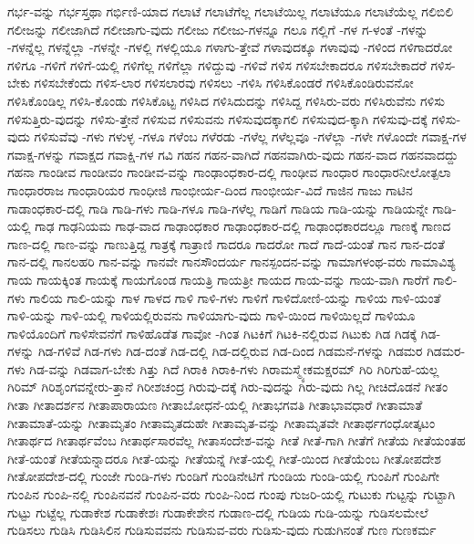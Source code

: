 {ಗರ್ಭ-ವನ್ನು
ಗರ್ಭಸ್ತಥಾ
ಗರ್ಭಿಣಿ-ಯಾದ
ಗಲಾಟೆ
ಗಲಾಟೆಗೆಲ್ಲ
ಗಲಾಟೆಯಿಲ್ಲ
ಗಲಾಟೆಯೂ
ಗಲಾಟೆಯೆಲ್ಲ
ಗಲಿಬಿಲಿ
ಗಲೀಜನ್ನು
ಗಲೀಜಾಗಿದೆ
ಗಲೀಜಾಗು-ವುದು
ಗಲೀಜು
ಗಲೀಜು-ಗಳನ್ನೂ
ಗಲೂ
ಗಲ್ಲಿಗೆ
-ಗಳ
ಗ-ಳಂತೆ
-ಗಳನ್ನು
-ಗಳನ್ನೆಲ್ಲ
ಗಳನ್ನೆಲ್ಲಾ
-ಗಳನ್ನೇ
-ಗಳಲ್ಲಿ
ಗಳಲ್ಲಿಯೂ
ಗಳಾಗು-ತ್ತೇವೆ
ಗಳಾವುದಕ್ಕೂ
ಗಳಾವುವು
-ಗಳಿಂದ
ಗಳಿಗಾದರೋ
ಗಳಿಗೂ
-ಗಳಿಗೆ
ಗಳಿಗೆ-ಯಲ್ಲಿ
ಗಳಿಗೆಲ್ಲ
ಗಳಿಗೆಲ್ಲಾ
ಗಳಿದ್ದುವು
-ಗಳಿವೆ
ಗಳಿಸ
ಗಳಿಸಬೇಕಾದರೂ
ಗಳಿಸಬೇಕಾದರೆ
ಗಳಿಸ-ಬೇಕು
ಗಳಿಸಬೇಕೆಂದು
ಗಳಿಸ-ಲಾರ
ಗಳಿಸಲಾರವು
ಗಳಿಸಲು
-ಗಳಿಸಿ
ಗಳಿಸಿಕೊಂಡರೆ
ಗಳಿಸಿಕೊಂಡಿರುವನೋ
ಗಳಿಸಿಕೊಂಡಿಲ್ಲ
ಗಳಿಸಿ-ಕೊಂಡು
ಗಳಿಸಿಕೊಟ್ಟ
ಗಳಿಸಿದ
ಗಳಿಸಿದುದನ್ನು
ಗಳಿಸಿದ್ದ
ಗಳಿಸಿರು-ವರು
ಗಳಿಸಿರುವೆನು
ಗಳಿಸು
ಗಳಿಸುತ್ತಿರು-ವುದನ್ನು
ಗಳಿಸು-ತ್ತೇನೆ
ಗಳಿಸುವ
ಗಳಿಸುವನು
ಗಳಿಸುವುದಕ್ಕಾಗಲಿ
ಗಳಿಸುವುದ-ಕ್ಕಾಗಿ
ಗಳಿಸುವು-ದಕ್ಕೆ
ಗಳಿಸು-ವುದು
ಗಳಿಸುವೆವು
-ಗಳು
ಗಳುಳ್ಳ
-ಗಳೂ
ಗಳೆಂಬ
ಗಳೆರಡು
-ಗಳೆಲ್ಲ
ಗಳೆಲ್ಲವೂ
-ಗಳೆಲ್ಲಾ
-ಗಳೇ
ಗಳೊಂದೇ
ಗವಾಕ್ಷ-ಗಳ
ಗವಾಕ್ಷ-ಗಳನ್ನು
ಗವಾಕ್ಷದ
ಗವಾಕ್ಷಿ-ಗಳ
ಗವಿ
ಗಹನ
ಗಹನ-ವಾಗಿದೆ
ಗಹನವಾಗಿರು-ವುದು
ಗಹನ-ವಾದ
ಗಹನವಾದದ್ದು
ಗಹನಾ
ಗಾಂಡೀವ
ಗಾಂಡೀವಂ
ಗಾಂಡೀವ-ವನ್ನು
ಗಾಂಢಾಂಧಕಾರ-ದಲ್ಲಿ
ಗಾಂಢೀವ
ಗಾಂಧಾರ
ಗಾಂಧಾರನೀಲೋತ್ಪಲಾ
ಗಾಂಧಾರರಾಜ
ಗಾಂಧಾರಿಯರ
ಗಾಂಧೀಜಿ
ಗಾಂಭೀರ್ಯ-ದಿಂದ
ಗಾಂಭೀರ್ಯ-ವಿದೆ
ಗಾಜಿನ
ಗಾಜು
ಗಾಟಿನ
ಗಾಡಾಂಧಕಾರ-ದಲ್ಲಿ
ಗಾಡಿ
ಗಾಡಿ-ಗಳು
ಗಾಡಿ-ಗಳೂ
ಗಾಡಿ-ಗಳೆಲ್ಲ
ಗಾಡಿಗೆ
ಗಾಡಿಯ
ಗಾಡಿ-ಯನ್ನು
ಗಾಡಿಯನ್ನೇ
ಗಾಡಿ-ಯಲ್ಲಿ
ಗಾಢ
ಗಾಢನಿಯಮ
ಗಾಢ-ವಾದ
ಗಾಢಾಂಧಕಾರ
ಗಾಢಾಂಧಕಾರ-ದಲ್ಲಿ
ಗಾಢಾಂಧಕಾರದಲ್ಲೂ
ಗಾಣಕ್ಕೆ
ಗಾಣದ
ಗಾಣ-ದಲ್ಲಿ
ಗಾಣ-ವನ್ನು
ಗಾಣುತ್ತಿದ್ದ
ಗಾತ್ರಕ್ಕೆ
ಗಾತ್ರಾಣಿ
ಗಾದರೂ
ಗಾದರೋ
ಗಾದೆ
ಗಾದೆ-ಯಂತೆ
ಗಾನ
ಗಾನ-ದಂತೆ
ಗಾನ-ದಲ್ಲಿ
ಗಾನಲಹರಿ
ಗಾನ-ವನ್ನು
ಗಾನವೇ
ಗಾನಸೌಂದರ್ಯ
ಗಾನಸ್ಪಂದನ-ವನ್ನು
ಗಾಮಾಗಳಂಥ-ವರು
ಗಾಮಾವಿಶ್ಯ
ಗಾಯ
ಗಾಯಕ್ಕಿಂತ
ಗಾಯಕ್ಕೆ
ಗಾಯಗೊಂಡ
ಗಾಯತ್ರಿ
ಗಾಯತ್ರೀ
ಗಾಯದ
ಗಾಯ-ವನ್ನು
ಗಾಯ-ವಾಗಿ
ಗಾರೆಗೆ
ಗಾಲಿ-ಗಳು
ಗಾಲಿಯ
ಗಾಲಿ-ಯನ್ನು
ಗಾಳ
ಗಾಳದ
ಗಾಳಿ
ಗಾಳಿ-ಗಳು
ಗಾಳಿಗೆ
ಗಾಳಿದೋಣಿ-ಯನ್ನು
ಗಾಳಿಯ
ಗಾಳಿ-ಯಂತೆ
ಗಾಳಿ-ಯನ್ನು
ಗಾಳಿ-ಯಲ್ಲಿ
ಗಾಳಿಯಲ್ಲಿರುವನು
ಗಾಳಿಯಾಗು-ವುದು
ಗಾಳಿ-ಯಿಂದ
ಗಾಳಿಯಿಲ್ಲದೆ
ಗಾಳಿಯೂ
ಗಾಳಿಯೊಂದಿಗೆ
ಗಾಳಿಸೇವನೆಗೆ
ಗಾಳಿಹೊಡೆತ
ಗಾವೋ
-ಗಿಂತ
ಗಿಟಕಿಗೆ
ಗಿಟಕಿ-ನಲ್ಲಿರುವ
ಗಿಟುಕು
ಗಿಡ
ಗಿಡಕ್ಕೆ
ಗಿಡ-ಗಳನ್ನು
ಗಿಡ-ಗಳಿವೆ
ಗಿಡ-ಗಳು
ಗಿಡ-ದಂತೆ
ಗಿಡ-ದಲ್ಲಿ
ಗಿಡ-ದಲ್ಲಿರುವ
ಗಿಡ-ದಿಂದ
ಗಿಡಮನೆ-ಗಳನ್ನು
ಗಿಡಮರ
ಗಿಡಮರ-ಗಳು
ಗಿಡ-ವನ್ನು
ಗಿಡವಾಗ-ಬೇಕು
ಗಿತ್ತು
ಗಿದೆ
ಗಿರಾಕಿ
ಗಿರಾಕಿ-ಗಳು
ಗಿರಾಮಸ್ಮ್ಯೇಕಮಕ್ಷರಮ್
ಗಿರಿ
ಗಿರಿಗುಹೆ-ಯಲ್ಲ
ಗಿರಿಮ್
ಗಿರಿಶೃಂಗವನ್ನೇರು-ತ್ತಾನೆ
ಗಿರೀಶಚಂದ್ರ
ಗಿರುವು-ದಕ್ಕೆ
ಗಿರು-ವುದನ್ನು
ಗಿರು-ವುದು
ಗಿಲ್ಲ
ಗೀಚಿದೊಡನೆ
ಗೀತಂ
ಗೀತಾ
ಗೀತಾದರ್ಶನ
ಗೀತಾಪಾರಾಯಣ
ಗೀತಾಬೋಧನೆ-ಯಲ್ಲಿ
ಗೀತಾಭಗವತಿ
ಗೀತಾಭಾವಧಾರೆ
ಗೀತಾಮಾತೆ
ಗೀತಾಮಾತೆ-ಯನ್ನು
ಗೀತಾಮೃತಂ
ಗೀತಾಮೃತದುಹೇ
ಗೀತಾಮೃತ-ವನ್ನು
ಗೀತಾಮೃತವೇ
ಗೀತಾರ್ಥಗಂಧೋತ್ಕಟಂ
ಗೀತಾರ್ಥದ
ಗೀತಾರ್ಥವೆಂಬ
ಗೀತಾರ್ಥಸಾರವೆಲ್ಲ
ಗೀತಾಸಂದೇಶ-ವನ್ನು
ಗೀತೆ
ಗೀತೆ-ಗಾಗಿ
ಗೀತೆಗೆ
ಗೀತೆಯ
ಗೀತೆಯಂತಹ
ಗೀತೆ-ಯಂತೆ
ಗೀತೆಯನ್ನಾದರೂ
ಗೀತೆ-ಯನ್ನು
ಗೀತೆಯನ್ನೆ
ಗೀತೆ-ಯಲ್ಲಿ
ಗೀತೆ-ಯಿಂದ
ಗೀತೆಯೆಂಬ
ಗೀತೋಪದೇಶ
ಗೀತೋಪದೇಶ-ದಲ್ಲಿ
ಗುಂಜೇ
ಗುಂಡಿ-ಗಳು
ಗುಂಡಿಗೆ
ಗುಂಡಿನೇಟಿಗೆ
ಗುಂಡಿಯ
ಗುಂಡಿ-ಯಲ್ಲಿ
ಗುಂಪಿಗೆ
ಗುಂಪಿಗೇ
ಗುಂಪಿನ
ಗುಂಪಿ-ನಲ್ಲಿ
ಗುಂಪಿನವನೆ
ಗುಂಪಿನ-ವರು
ಗುಂಪಿ-ನಿಂದ
ಗುಂಪು
ಗುಜರಿ-ಯಲ್ಲಿ
ಗುಟುಕು
ಗುಟ್ಟನ್ನು
ಗುಟ್ಟಾಗಿ
ಗುಟ್ಟು
ಗುಟ್ಟೆಲ್ಲ
ಗುಡಾಕೇಶ
ಗುಡಾಕೇಶಃ
ಗುಡಾಕೇಶೇನ
ಗುಡಾಣ-ದಲ್ಲಿ
ಗುಡಿಯ
ಗುಡಿ-ಯನ್ನು
ಗುಡಿಸಲಮೇಲೆ
ಗುಡಿಸಲು
ಗುಡಿಸಿ
ಗುಡಿಸಿಲಿನ
ಗುಡಿಸುವವನು
ಗುಡಿಸುವ-ವರು
ಗುಡಿಸು-ವುದು
ಗುಡುಗಿನಂತೆ
ಗುಣ
ಗುಣಕರ್ಮ
}
